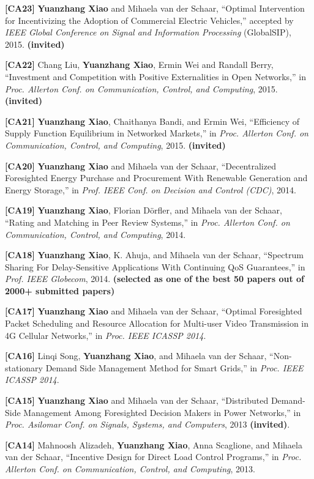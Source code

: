 \documentclass[margin,line]{res}
\begin{document}
\begin{resume}
\textbf{[CA23]} {\bf Yuanzhang Xiao} and Mihaela van der Schaar, ``Optimal Intervention for Incentivizing the Adoption of Commercial Electric Vehicles,'' accepted by \emph{IEEE Global Conference on Signal and Information Processing} (GlobalSIP), 2015. {\bf (invited)}

\textbf{[CA22]} Chang Liu, {\bf Yuanzhang Xiao}, Ermin Wei and Randall Berry, ``Investment and Competition with Positive Externalities in Open Networks,'' in \emph{Proc. Allerton Conf. on Communication, Control, and Computing}, 2015. {\bf (invited)}

\textbf{[CA21]} {\bf Yuanzhang Xiao}, Chaithanya Bandi, and Ermin Wei, ``Efficiency of Supply Function Equilibrium in Networked Markets,'' in \emph{Proc. Allerton Conf. on Communication, Control, and Computing}, 2015. {\bf (invited)}

\textbf{[CA20]} {\bf Yuanzhang Xiao} and Mihaela van der Schaar, ``Decentralized Foresighted Energy Purchase and Procurement With Renewable Generation and Energy Storage,'' in \emph{Prof. IEEE Conf. on Decision and Control (CDC)}, 2014.

\textbf{[CA19]} {\bf Yuanzhang Xiao}, Florian D\"{o}rfler, and Mihaela van der Schaar, ``Rating and Matching in Peer Review Systems,'' in \emph{Proc. Allerton Conf. on Communication, Control, and Computing}, 2014.

\textbf{[CA18]} {\bf Yuanzhang Xiao}, K. Ahuja, and Mihaela van der Schaar, ``Spectrum Sharing For Delay-Sensitive Applications With Continuing QoS Guarantees,'' in \emph{Prof. IEEE Globecom}, 2014. {\bf (selected as one of the best 50 papers out of 2000+ submitted papers)}

\textbf{[CA17]} {\bf Yuanzhang Xiao} and Mihaela van der Schaar, ``Optimal Foresighted Packet Scheduling and Resource Allocation for Multi-user Video Transmission in 4G Cellular Networks,'' in \emph{Proc. IEEE ICASSP 2014}.

\textbf{[CA16]} Linqi Song, {\bf Yuanzhang Xiao}, and Mihaela van der Schaar, ``Non-stationary Demand Side Management Method for Smart Grids,'' in \emph{Proc. IEEE ICASSP 2014}.

\textbf{[CA15]} {\bf Yuanzhang Xiao} and Mihaela van der Schaar, ``Distributed Demand-Side Management Among Foresighted Decision Makers in Power
Networks,'' in \emph{Proc. Asilomar Conf. on Signals, Systems, and Computers}, 2013 {\bf (invited)}.

\textbf{[CA14]}  Mahnoosh Alizadeh, {\bf Yuanzhang Xiao}, Anna Scaglione, and Mihaela van der Schaar, ``Incentive Design for Direct Load Control Programs,'' in \emph{Proc. Allerton Conf. on Communication, Control, and Computing}, 2013.


\end{resume}
\end{document}
